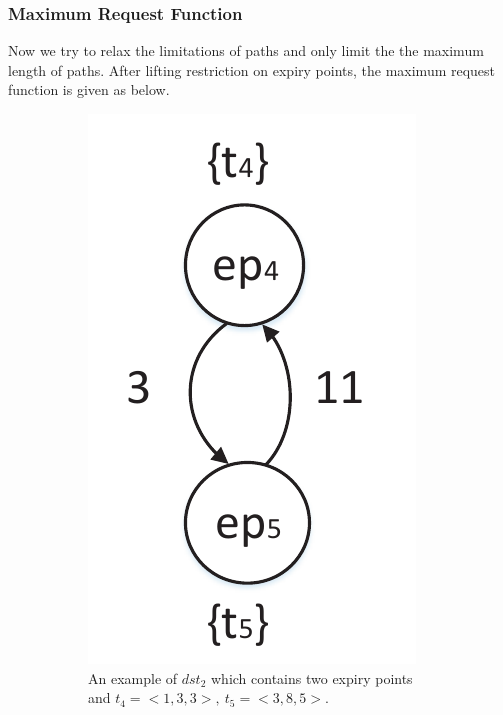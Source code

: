\documentclass[10pt,conference]{IEEEtran}
\begin{document}

\subsubsection{Maximum Request Function}
Now we try to relax the limitations of paths and only limit the the maximum length of paths. After lifting restriction on expiry points, the maximum request function is given as below.
\begin{figure}
  \centering
  \begin{subfigure}[t]{3.25in}
    \centering
    \includegraphics[scale=.5]{graphics/figure_dst2-eps-converted-to.pdf}
    \caption{An example of $dst_2$ which contains two expiry points and $t_4=<1,3,3>,\ t_5=<3,8,5>$.}\label{figure_dst2}
  \end{subfigure}
  \quad
  \begin{subfigure}[t]{3.25in}

\end{subfigure}
\end{figure}
\end{document}
